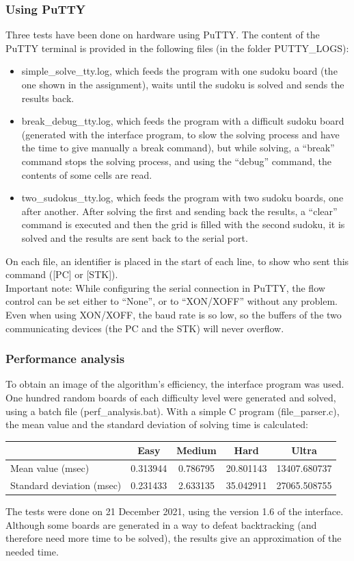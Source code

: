 \documentclass[12pt, a4, hidelinks]{article}
\begin{document}
\subsubsection*{Using PuTTY}
Three tests have been done on hardware using PuTTY. The content of the PuTTY terminal is provided in the following files (in the folder PUTTY\_LOGS):
\begin{itemize}
\item simple\_solve\_tty.log, which feeds the program with one sudoku board (the one shown in the assignment), waits until the sudoku is solved and sends the results back.
\item break\_debug\_tty.log, which feeds the program with a difficult sudoku board (generated with the interface program, to slow the solving process and have the time to give manually a break command), but while solving, a ``break'' command stops the solving process, and using the ``debug'' command, the contents of some cells are read.
\item two\_sudokus\_tty.log, which feeds the program with two sudoku boards, one after another. After solving the first and sending back the results, a ``clear'' command is executed and then the grid is filled with the second sudoku, it is solved and the results are sent back to the serial port.
\end{itemize}
On each file, an identifier is placed in the start of each line, to show who sent this command ([PC] or [STK]).\\
Important note: While configuring the serial connection in PuTTY, the flow control can be set either to ``None'', or to ``XON/XOFF'' without any problem. Even when using XON/XOFF, the baud rate is so low, so the buffers of the two communicating devices (the PC and the STK) will never overflow.

\subsubsection*{Performance analysis}
To obtain an image of the algorithm's efficiency, the interface program was used. One hundred random boards of each difficulty level were generated and solved, using a batch file (perf\_analysis.bat). With a simple C program (file\_parser.c), the mean value and the standard deviation of solving time is calculated:
\begin{center}
\begin{tabular}{ |l|c|c|c|c| } 
 \hline
                                      & Easy         & Medium & Hard & Ultra  \\  \hline
Mean value (msec)           &  0.313944  &  0.786795   &  20.801143       &  13407.680737        \\ \hline
Standard deviation (msec) &  0.231433  & 2.633135   & 35.042911        &  27065.508755         \\ \hline
\end{tabular}
\end{center}
\noindent The tests were done on 21 December 2021, using the version 1.6 of the interface. Although some boards are generated in a way to defeat backtracking (and therefore need more time to be solved), the results give an approximation of the needed time.
\end{document}
